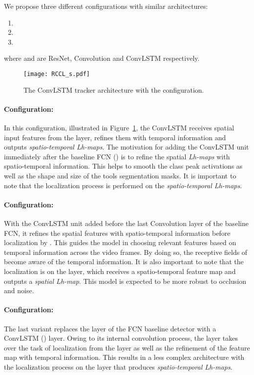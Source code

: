 \documentclass{svjour3}                     \smartqed
\newcommand{\bd}[1]{\textbf{#1}}
\begin{document}
We propose three different configurations with similar architectures:
\begin{enumerate}
\item 
\item 
\item 
\end{enumerate}
where  and  are ResNet, Convolution and ConvLSTM respectively.
\begin{figure}[t]\centering
        \texttt{[image: RCCL\_s.pdf]}
        \caption{The ConvLSTM tracker architecture with the  configuration.}
    \label{fig:RCCL}
\end{figure}
\paragraph{ \bd{Configuration}:} In this configuration, illustrated in Figure~\ref{fig:RCCL}, the ConvLSTM receives spatial input features from the  layer, refines them with temporal information and outputs \emph{spatio-temporal Lh-maps}. The motivation for adding the ConvLSTM unit immediately after the baseline FCN () is to refine the spatial \emph{Lh-maps} with spatio-temporal information. This helps to smooth the class peak activations as well as the shape and size of the tools segmentation masks. It is important to note that the localization process is performed on the \textit{spatio-temporal Lh-maps}.

\paragraph{ \bd{Configuration}:} With the ConvLSTM unit added before the last Convolution layer of the baseline FCN, it refines the  spatial features with spatio-temporal information before localization by . This guides the model in choosing relevant features based on temporal information across the video frames. By doing so, the receptive fields of   become aware of the temporal information. 
It is also important to note that the localization is on the  layer, which receives a spatio-temporal feature map and outputs a \textit{spatial Lh-map}. 
This model is expected to be more robust to occlusion and noise. 

\paragraph{ \bd{Configuration}:} The last variant replaces the  layer of the FCN baseline detector with a ConvLSTM () layer. 
Owing to its internal convolution process, the  layer takes over the task of localization from the  layer as well as the refinement of the feature map with temporal information. This results in a less complex architecture with the localization process on the  layer that produces \textit{spatio-temporal Lh-maps}.
\end{document}
